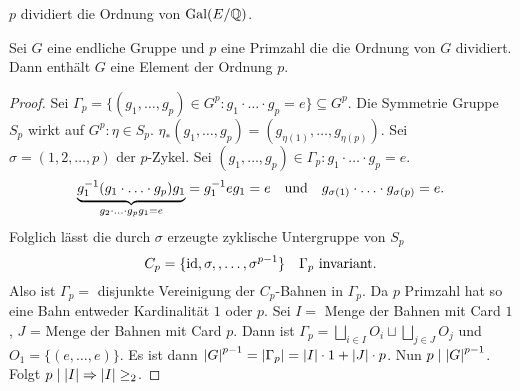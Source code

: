 \begin{corollary}
	$p$ dividiert die Ordnung von $\operatorname{Gal}(E / \mathbb{Q})$.
\end{corollary}

\begin{lemma}[Cauchy]
	Sei $G$ eine endliche Gruppe und $p$ eine Primzahl die die Ordnung von $G$ dividiert.
	Dann enthält $G$ eine Element der Ordnung $p$.
\end{lemma}

\begin{proof}
	Sei $\Gamma_{p} = \{(g_1,\ldots, g_{p}) \in G^{p}: g_1 \cdot \ldots \cdot g_{p} = e\} \subseteq G^{p}$.
	Die Symmetrie Gruppe $S_{p}$ wirkt auf $G^{p}: \eta \in S_{p}$. $\eta_{*}(g_1,\ldots,g_{p}) = (g_{\eta(1)},\ldots,g_{\eta(p)})$.
	Sei $\sigma = (1,2,\ldots,p)$ der $p$-Zykel.
	Sei $(g_1,\ldots,g_{p}) \in \Gamma_{p}: g_1 \cdot \ldots \cdot g_{p} = e$.
	\[
		\underbrace{g_1^{-1} (g_1 \cdot \ldots\cdot g_{p}) g_{1}}_{g_2 \cdot \ldots\cdot g_{p} g_1 = e} = g_1^{-1} e g_1 = e \qq{und} g_{\sigma(1)} \cdot \ldots\cdot g_{\sigma(p)} = e
	.\] 
	Folglich lässt die durch $\sigma$ erzeugte zyklische Untergruppe von $S_{p}$ 
	\[
	C_{p} = \{\operatorname{id}, \sigma, ,\ldots, \sigma^{p-1}\} \quad \Gamma_{p} \text{ invariant}
	.\]
	Also ist $\Gamma_{p} = $ disjunkte Vereinigung der $C_{p}$-Bahnen in $\Gamma_{p}$.
	Da $p$ Primzahl hat so eine Bahn entweder Kardinalität $1 $ oder $p$.
	Sei $I = $ Menge der Bahnen mit Card $1$, $J$ = Menge der Bahnen mit Card $p$.
	Dann ist  $\Gamma_{p} = \bigsqcup_{i \in I} O_{i} \sqcup \bigsqcup_{j \in J} O_{j}$ und $O_1 = \{(e,\ldots,e)\}$.
	Es ist dann $\abs{G}^{p-1} = \abs{\Gamma_{p}} = \abs{I} \cdot 1 + \abs{J} \cdot p$.
	Nun $p \mid \abs{G}^{p-1}$. Folgt $p \mid \abs{I} \Rightarrow \abs{I} \geq_2$.
\end{proof}


































